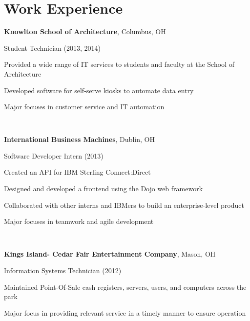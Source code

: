 \documentclass[letterpaper]{resume}
\begin{document}
\section{Work Experience}
\textbf{Knowlton School of Architecture}, Columbus, OH

Student Technician (2013, 2014)
\begin{compactitem}
\item Provided a wide range of IT services to students and faculty at the
	School of Architecture
\item Developed software for self-serve kiosks to automate data entry
\item Major focuses in customer service and IT automation
\end{compactitem}

~

\textbf{International Business Machines}, Dublin, OH

Software Developer Intern (2013)
\begin{compactitem}
\item Created an API for IBM Sterling Connect:Direct

\item Designed and developed a frontend using the Dojo web framework

\item Collaborated with other interns and IBMers to build an enterprise-level product

\item Major focuses in teamwork and agile development
\end{compactitem}

~

\textbf{Kings Island- Cedar Fair Entertainment Company}, Mason, OH

Information Systems Technician (2012)
\begin{compactitem}
\item Maintained Point-Of-Sale cash registers, servers, users, and computers across the park



\item Major focus in providing relevant service in a timely manner to ensure operation
\end{compactitem}
\end{document}
